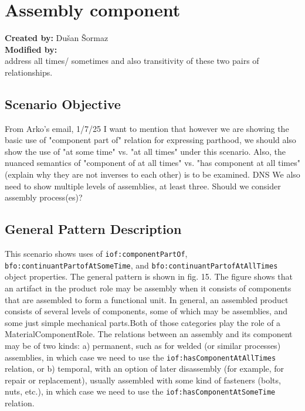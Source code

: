 \section{Assembly component}

\textbf{Created by:} Dušan Šormaz \\
\textbf{Modified by:}  \\

address all times/ sometimes and also transitivity of these two pairs of relationships.

\subsection*{Scenario Objective}
From Arko's email, 1/7/25 
I want to mention that however we are showing the basic use of "component part of" relation for expressing parthood, we should also show the use of "at some time" vs. "at all times" under this scenario. Also, the nuanced semantics of "component of at all times" vs. "has component at all times" (explain why they are not inverses to each other) is to be examined.
DNS
We also need to show multiple levels of assemblies, at least three. Should we consider assembly process(es)?
\subsection*{General Pattern Description}
This scenario shows uses of \texttt{iof:componentPartOf}, \texttt{bfo:continuantPartofAtSomeTime}, and \texttt{bfo:continuantPartofAtAllTimes} object properties. The general pattern is shown in fig. 15. The figure shows that an artifact in the product role may be assembly when it consists of components that are assembled to form a functional unit. In general, an assembled product consists of several levels of components, some of which may be assemblies, and some just simple mechanical parts.Both of those categories play the role of a MaterialComponentRole. The relations between an assembly and its component may be of two kinds: a) permanent, such as for welded (or similar processes) assemblies, in which case we need to use the \texttt{iof:hasComponentAtAllTimes} relation, or b) temporal, with an option of later disassembly (for example, for repair or replacement), usually assembled with some  kind of fasteners (bolts, nuts, etc.), in which case we need to use the \texttt{iof:hasComponentAtSomeTime} relation.

